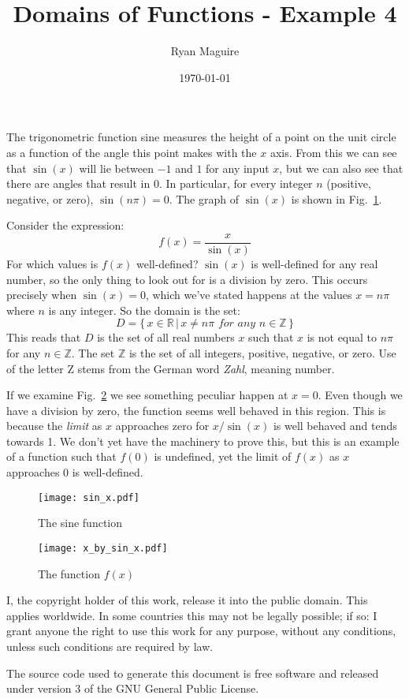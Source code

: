 \documentclass{article}
\title{Domains of Functions - Example 4}
\author{Ryan Maguire}
\date{\today}
\begin{document}
    \maketitle
    The trigonometric function sine measures the height of a point on the
    unit circle as a function of the angle this point makes with the $x$ axis.
    From this we can see that $\sin(x)$ will lie between $-1$ and $1$ for any
    input $x$, but we can also see that there are angles that result in
    $0$. In particular, for every integer $n$ (positive, negative, or zero),
    $\sin(n\pi)=0$. The graph of $\sin(x)$ is shown in
    Fig.~\ref{fig:sin_x}.
    \par\hfill\par
    Consider the expression:
    \begin{equation}
        f(x)=\frac{x}{\sin(x)}
    \end{equation}
    For which values is $f(x)$ well-defined? $\sin(x)$ is well-defined for any
    real number, so the only thing to look out for is a division by zero.
    This occurs precisely when $\sin(x)=0$, which we've stated happens at the
    values $x=n\pi$ where $n$ is any integer. So the domain is the set:
    \begin{equation}
        D=\{\,x\in\mathbb{R}\,|\,x\ne{n\pi}\textit{ for any }n\in\mathbb{Z}\,\}
    \end{equation}
    This reads that $D$ is the set of all real numbers $x$ such that $x$ is
    not equal to $n\pi$ for any $n\in\mathbb{Z}$. The set $\mathbb{Z}$ is the
    set of all integers, positive, negative, or zero. Use of the letter Z stems
    from the German word \textit{Zahl}, meaning number.
    \par\hfill\par
    If we examine Fig.~\ref{fig:x_by_sin_x} we see something peculiar happen
    at $x=0$. Even though we have a division by zero, the function seems well
    behaved in this region. This is because the \textit{limit} as $x$
    approaches zero for $x/\sin(x)$ is well behaved and tends towards 1. We
    don't yet have the machinery to prove this, but this is an example of a
    function such that $f(0)$ is undefined, yet the limit of $f(x)$ as $x$
    approaches 0 is well-defined.
    \begin{figure}
        \centering
        \texttt{[image: sin\_x.pdf]}
        \caption{The sine function}
        \label{fig:sin_x}
    \end{figure}
    \begin{figure}
        \centering
        \texttt{[image: x\_by\_sin\_x.pdf]}
        \caption{The function $f(x)$}
        \label{fig:x_by_sin_x}
    \end{figure}
    \newpage
    I, the copyright holder of this work, release it into the public domain.
    This applies worldwide. In some countries this may not be legally possible;
    if so: I grant anyone the right to use this work for any purpose, without
    any conditions, unless such conditions are required by law.
    \par\hfill\par
    The source code used to generate this document is free software and released
    under version 3 of the GNU General Public License.
\end{document}
